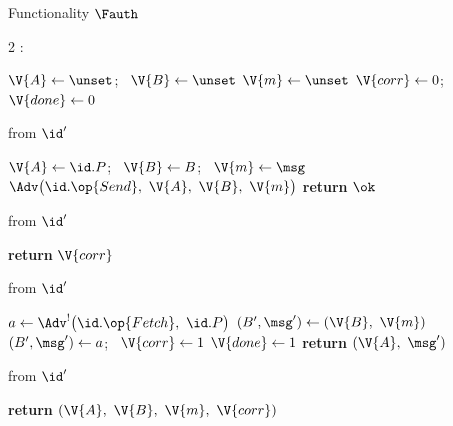 \begin{interface}[nofloat]{Functionality $\Fauth$ \\
\params{$\PID$, \quad $\Ps$, \quad $\admits$, \quad
$\uses := \{(\Adv,\serves)\}$, \quad $\pars := \none$}}

{\scriptsize
\setlength{\columnsep}{1.4em}
\begin{multicols}{2}
:
\begin{algorithmic}[1]
\setcounter{contline}{0}\algcont
\State $\V{A} \gets \unset$; \ $\V{B} \gets \unset$
\State $\V{m} \gets \unset$
\State $\V{corr} \gets 0$; \ $\V{done} \gets 0$
\algsave
\end{algorithmic}
\vspace{1.4ex}

 \quad from $\id'$
\begin{algorithmic}[1]
\algcont
{} \label{ln:authonce}
\State $\V{A} \gets \id.P$; \ $\V{B} \gets B$; \ $\V{m} \gets \msg$
\State $\Adv\bigl(\id.\op{Send},\ \V{A},\ \V{B},\ \V{m}\bigr)$ \label{ln:authleak}
\State \textbf{return} $\ok$
\algsave
\end{algorithmic}
\vspace{1.4ex}

 \quad from $\id'$
\begin{algorithmic}[1]
\algcont
{}
\State \textbf{return} $\V{corr}$ \label{ln:authreport}
\algsave
\end{algorithmic}
\vspace{1.4ex}

\columnbreak

 \quad from $\id'$
\begin{algorithmic}[1]
\algcont
{}
\State $a \gets \Adv^{!}\bigl(\id.\op{Fetch},\ \id.P\bigr)$ \label{ln:authdeliver}
\State $(B', \msg') \gets (\V{B},\ \V{m})$ \label{ln:authhonest}
  \State $(B', \msg') \gets a$; \ $\V{corr} \gets 1$ \label{ln:authsub}
\EndIf
{} \label{ln:authaddr}
\State $\V{done} \gets 1$
\State \textbf{return} $(\V{A},\ \msg')$
\algsave
\end{algorithmic}
\vspace{1.4ex}

 \quad from $\id'$
\begin{algorithmic}[1]
\algcont
\State \textbf{return} $(\V{A},\ \V{B},\ \V{m},\ \V{corr})$
\algsave
\end{algorithmic}
\end{multicols}}
\end{interface}
